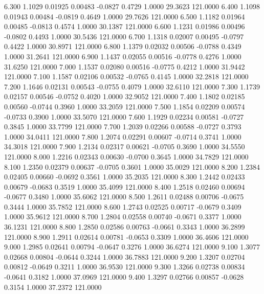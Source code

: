    6.300   1.1029   0.01925   0.00483  -0.0827   0.4729   1.0000  29.3623 121.0000
   6.400   1.1098   0.01943   0.00484  -0.0819   0.4649   1.0000  29.7626 121.0000
   6.500   1.1182   0.01964   0.00485  -0.0813   0.4574   1.0000  30.1387 121.0000
   6.600   1.1231   0.01986   0.00496  -0.0802   0.4493   1.0000  30.5436 121.0000
   6.700   1.1318   0.02007   0.00495  -0.0797   0.4422   1.0000  30.8971 121.0000
   6.800   1.1379   0.02032   0.00506  -0.0788   0.4349   1.0000  31.2641 121.0000
   6.900   1.1437   0.02055   0.00516  -0.0778   0.4276   1.0000  31.6250 121.0000
   7.000   1.1537   0.02080   0.00516  -0.0775   0.4212   1.0000  31.9442 121.0000
   7.100   1.1587   0.02106   0.00532  -0.0765   0.4145   1.0000  32.2818 121.0000
   7.200   1.1646   0.02131   0.00543  -0.0755   0.4079   1.0000  32.6110 121.0000
   7.300   1.1739   0.02157   0.00546  -0.0752   0.4020   1.0000  32.9052 121.0000
   7.400   1.1802   0.02185   0.00560  -0.0744   0.3960   1.0000  33.2059 121.0000
   7.500   1.1854   0.02209   0.00574  -0.0733   0.3900   1.0000  33.5070 121.0000
   7.600   1.1929   0.02234   0.00581  -0.0727   0.3845   1.0000  33.7799 121.0000
   7.700   1.2039   0.02266   0.00588  -0.0727   0.3793   1.0000  34.0411 121.0000
   7.800   1.2074   0.02291   0.00607  -0.0714   0.3741   1.0000  34.3018 121.0000
   7.900   1.2134   0.02317   0.00621  -0.0705   0.3690   1.0000  34.5550 121.0000
   8.000   1.2216   0.02343   0.00630  -0.0700   0.3645   1.0000  34.7829 121.0000
   8.100   1.2350   0.02379   0.00637  -0.0705   0.3601   1.0000  35.0029 121.0000
   8.200   1.2384   0.02405   0.00660  -0.0692   0.3561   1.0000  35.2035 121.0000
   8.300   1.2442   0.02433   0.00679  -0.0683   0.3519   1.0000  35.4099 121.0000
   8.400   1.2518   0.02460   0.00694  -0.0677   0.3480   1.0000  35.6062 121.0000
   8.500   1.2611   0.02488   0.00706  -0.0675   0.3444   1.0000  35.7852 121.0000
   8.600   1.2743   0.02525   0.00717  -0.0679   0.3409   1.0000  35.9612 121.0000
   8.700   1.2804   0.02558   0.00740  -0.0671   0.3377   1.0000  36.1231 121.0000
   8.800   1.2850   0.02586   0.00763  -0.0661   0.3343   1.0000  36.2899 121.0000
   8.900   1.2911   0.02614   0.00781  -0.0653   0.3309   1.0000  36.4606 121.0000
   9.000   1.2985   0.02641   0.00794  -0.0647   0.3276   1.0000  36.6274 121.0000
   9.100   1.3077   0.02668   0.00804  -0.0644   0.3244   1.0000  36.7883 121.0000
   9.200   1.3207   0.02704   0.00812  -0.0649   0.3211   1.0000  36.9530 121.0000
   9.300   1.3266   0.02738   0.00834  -0.0641   0.3182   1.0000  37.0969 121.0000
   9.400   1.3297   0.02766   0.00857  -0.0628   0.3154   1.0000  37.2372 121.0000

